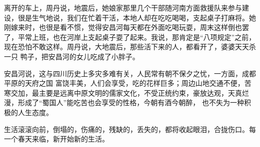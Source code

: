 \documentclass{article}
\begin{document}
离开的车上，周丹说，地震后，她娘家那里几个干部随河南方面救援队来参与建设，很是生气地说，我们在忙着干活，本地人却在吃吃喝喝，支起桌子打麻将。她刚嫁来时，也很是看不惯，觉得安昌河每天都在外面吃喝玩耍，周末这样倒也罢了，平常上班，也在河岸上支起桌子耍了起来。我说，那肯定是“八项规定”之前，现在恐怕不敢这样。周丹说，大地震后，那些活下来的人，都看开了，婆婆天天杀一只
鸭子，把安昌河的女儿吃成了小胖子。 

安昌河说，这与四川历史上多灾多难有关，人民常有朝不保夕之忧，一方面，成都平原的天府之国
\newpage
富饶丰美，人们会享受，吃的花样巨多；周边山地交通不便，苦寒交加，最主要是远离中原文明的儒家文化，不受正统约束，豪放达观，天真烂漫，形成了“蜀国人”能吃苦也会享受的性格，今朝有酒今朝醉，
也不失为一种积极的人生态度。 

生活滚滚向前，倒塌的，伤痛的，残缺的，丢失的，都将收起眼泪，合拢伤口。每一个春天来临，新开始新的生活。
\end{document}
